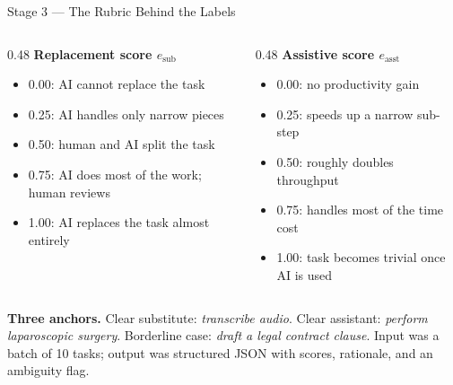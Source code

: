 \documentclass[10pt,english,aspectratio=169]{beamer}
\begin{document}
\begin{frame}{Stage 3 --- The Rubric Behind the Labels}
\begin{columns}[T]
\begin{column}{0.48\textwidth}
\textbf{Replacement score $e_{\text{sub}}$}
\begin{itemize}\scriptsize
  \item 0.00: AI cannot replace the task
  \item 0.25: AI handles only narrow pieces
  \item 0.50: human and AI split the task
  \item 0.75: AI does most of the work; human reviews
  \item 1.00: AI replaces the task almost entirely
\end{itemize}
\end{column}
\begin{column}{0.48\textwidth}
\textbf{Assistive score $e_{\text{asst}}$}
\begin{itemize}\scriptsize
  \item 0.00: no productivity gain
  \item 0.25: speeds up a narrow sub-step
  \item 0.50: roughly doubles throughput
  \item 0.75: handles most of the time cost
  \item 1.00: task becomes trivial once AI is used
\end{itemize}
\end{column}
\end{columns}

\vspace{0.12cm}
\begin{tcolorbox}[colback=gray!5,colframe=gray!40]\scriptsize
\textbf{Three anchors.} Clear substitute: \emph{transcribe audio}. Clear assistant: \emph{perform laparoscopic surgery}. Borderline case: \emph{draft a legal contract clause}. Input was a batch of 10 tasks; output was structured JSON with scores, rationale, and an ambiguity flag.
\end{tcolorbox}
\end{frame}
\end{document}
